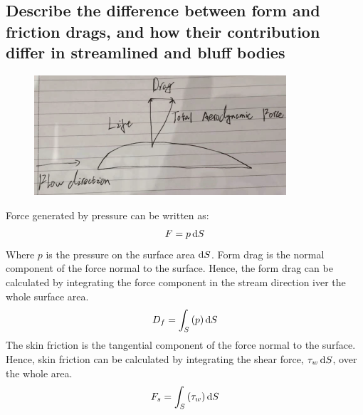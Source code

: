 \documentclass[11pt]{article}
\numberwithin{equation}{section}
\begin{document}
\subsection{Describe the difference between form and friction drags, and how their contribution differ in streamlined and bluff bodies}
\begin{figure}[H]
  \centering
  \includegraphics[width = 0.5 \textwidth]{./img/diagram1.png}
  \caption{}
\end{figure}
Force generated by pressure can be written as:
\begin{align}
  F = p \dif S
\end{align}
Where $p$ is the pressure on the surface area $\dif S$. Form drag is the normal component of the force normal to the surface. Hence, the form drag can be calculated by integrating the force component in the stream direction iver the whole surface area.
\begin{align}
  D_f = \int_S \left(p\right)\dif S
\end{align}
The skin friction is the tangential component of the force normal to the surface. Hence, skin friction can be calculated by integrating the shear force, $\tau_w \dif S$, over the whole area.
\begin{align}
  F_s = \int_S \left(\tau_w\right)\dif S
\end{align}
\end{document}
